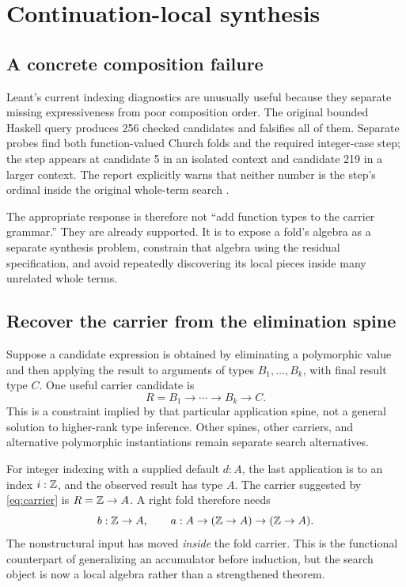 \section{Continuation-local synthesis}
\label{sec:continuations}

\subsection{A concrete composition failure}

Leant's current indexing diagnostics are unusually useful because they separate
missing expressiveness from poor composition order. The original bounded Haskell
query produces 256 checked candidates and falsifies all of them. Separate probes
find both function-valued Church folds and the required integer-case step; the
step appears at candidate 5 in an isolated context and candidate 219 in a larger
context. The report explicitly warns that neither number is the step's ordinal
inside the original whole-term search \cite{leant-diagnostic}.

The appropriate response is therefore not ``add function types to the carrier
grammar.'' They are already supported. It is to expose a fold's algebra as a
separate synthesis problem, constrain that algebra using the residual
specification, and avoid repeatedly discovering its local pieces inside many
unrelated whole terms.

\subsection{Recover the carrier from the elimination spine}

Suppose a candidate expression is obtained by eliminating a polymorphic value
and then applying the result to arguments of types $B_1,\ldots,B_k$, with final
result type $C$. One useful carrier candidate is
\begin{equation}\label{eq:carrier}
 R=B_1\to\cdots\to B_k\to C.
\end{equation}
This is a constraint implied by that particular application spine, not a general
solution to higher-rank type inference. Other spines, other carriers, and
alternative polymorphic instantiations remain separate search alternatives.

For integer indexing with a supplied default $d:A$, the last application is to
an index $i:\mathbb{Z}$, and the observed result has type $A$. The carrier suggested by
\eqref{eq:carrier} is $R=\mathbb{Z}\to A$. A right fold therefore needs
\[
 b:\mathbb{Z}\to A,
 \qquad a:A\to(\mathbb{Z}\to A)\to(\mathbb{Z}\to A).
\]
The nonstructural input has moved \emph{inside} the fold carrier. This is the
functional counterpart of generalizing an accumulator before induction, but the
search object is now a local algebra rather than a strengthened theorem.

